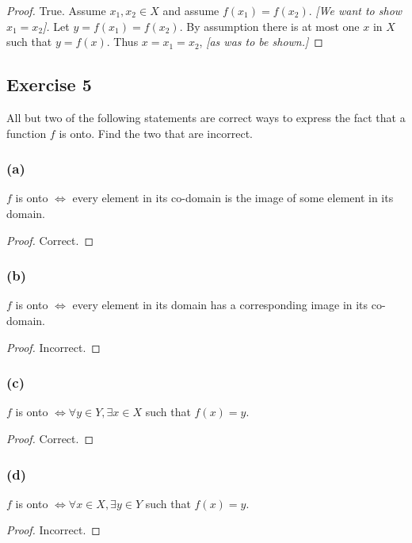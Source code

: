 \documentclass[14pt]{extarticle}
\begin{document}
\begin{proof}
True. Assume \(x_1, x_2 \in X\) and assume \(f(x_1) = f(x_2)\). {\it [We want to show \(x_1 = x_2\)].} Let 
\(y = f(x_1) = f(x_2)\). By assumption there is at most one $x$ in $X$ such that $y = f(x)$. Thus \(x = x_1 = x_2\),
{\it [as was to be shown.]}
\end{proof}

\subsection{Exercise 5}
All but two of the following statements are correct ways to express the fact that a function $f$ is onto. 
Find the two that are incorrect.

\subsubsection{(a)}
$f$ is onto $\iff$ every element in its co-domain is the image of some element in its domain.

\begin{proof}
Correct.
\end{proof}

\subsubsection{(b)}
$f$ is onto $\iff$ every element in its domain has a corresponding image in its co-domain.

\begin{proof}
Incorrect.
\end{proof}

\subsubsection{(c)}
$f$ is onto \(\iff  \forall y \in Y, \exists x \in X\) such that \(f(x) = y\).

\begin{proof}
Correct.
\end{proof}

\subsubsection{(d)}
$f$ is onto \(\iff \forall x \in X, \exists y \in Y\) such that \(f(x) = y\).

\begin{proof}
Incorrect.
\end{proof}
\end{document}
